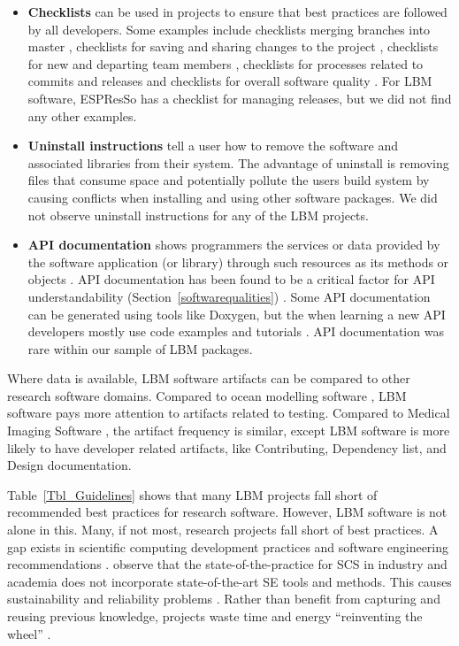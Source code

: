 \documentclass[final, 3p, times, authoryear]{elsarticle}
\begin{document}
\begin{itemize}
\item \textbf{Checklists} can be used in projects to ensure that best practices
are followed by all developers.  Some examples include checklists merging
branches into master \citep{Brown2015}, checklists for saving and sharing
changes to the project \citep{WilsonEtAl2016}, checklists for new and departing
team members \citep{HerouxAndBernholdt2018}, checklists for processes related to
commits and releases \citep{HerouxEtAl2008} and checklists for overall software
quality \citep{ThielEtAl2020, SSI2022}.  For LBM software, ESPResSo has a
checklist for managing releases, but we did not find any other examples.

\item \textbf{Uninstall instructions} tell a user how to remove the software and
associated libraries from their system.  The advantage of uninstall is removing
files that consume space and potentially pollute the users build system by
causing conflicts when installing and using other software packages.  We did not
observe uninstall instructions for any of the LBM projects.

\item \textbf{API documentation} shows programmers the services or data provided
by the software application (or library) through such resources as its methods
or objects \citep{MengEtAl2018}.  API documentation has been found to be a
critical factor for API understandability (Section~\ref{softwarequalities})
\citep{MengEtAl2018}. Some API documentation can be generated using tools like
Doxygen, but the when learning a new API developers mostly use code examples and
tutorials \citep{MengEtAl2018}.  API documentation was rare within our sample of
LBM packages.

\end{itemize}

Where data is available, LBM software artifacts can be compared to other
research software domains.  Compared to ocean modelling software
\citep{JungEtAl2022}, LBM software pays more attention to artifacts related to
testing.  Compared to Medical Imaging Software \citep{Dong2021}, the artifact
frequency is similar, except LBM software is more likely to have developer
related artifacts, like Contributing, Dependency list, and Design documentation.

Table~\ref{Tbl_Guidelines} shows that many LBM projects fall short of
recommended best practices for research software.  However, LBM software is not
alone in this.  Many, if not most, research projects fall short of best
practices.   A gap exists in scientific computing development practices and
software engineering recommendations \citep{Storer2017, Kelly2007,
OwojaiyeEtAl2021_CSE}. \citet{JohansonAndHasselbring2018} observe that the
state-of-the-practice for SCS in industry and academia does not incorporate
state-of-the-art SE tools and methods.  This causes sustainability and
reliability problems \citep{FaulkEtAl2009}. Rather than benefit from capturing
and reusing previous knowledge, projects waste time and energy ``reinventing the
wheel'' \citep{deSouzaEtAl2019}. 
\end{document}
